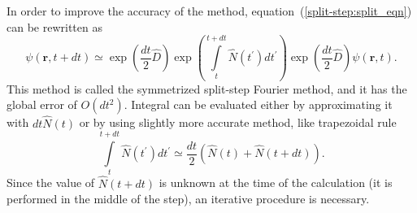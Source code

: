 \documentclass[12pt,notitlepage]{report}
\begin{document}
In order to improve the accuracy of the method, equation~(\ref{split-step:split_eqn}) can be rewritten as
\[
\psi(\mathbf{r}, t + dt) \simeq \exp \left( \frac{dt}{2} \hat{D} \right)
\exp \left( \int\limits^{t + dt}_t \hat{N} (t^\prime) dt^\prime \right)
\exp \left( \frac{dt}{2} \hat{D} \right) \psi(\mathbf{r}, t).
\]
This method is called the symmetrized split-step Fourier method, and it has the global error of $O(dt^2)$.
Integral can be evaluated either by approximating it with $dt \hat{N}(t)$ or by using slightly more accurate method,
like trapezoidal rule
\[
\int\limits^{t + dt}_t \hat{N} (t^\prime) dt^\prime \simeq
\frac{dt}{2} \left( \hat{N}(t) + \hat{N}(t + dt) \right).
\]
Since the value of $\hat{N}(t + dt)$ is unknown at the time of the calculation
(it is performed in the middle of the step), an iterative procedure is necessary.



\end{document}
